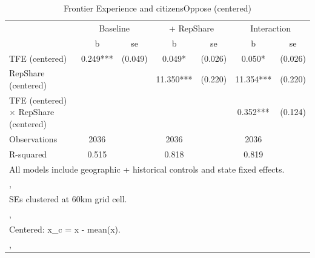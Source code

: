 \begin{table}[htbp]\centering
\def\sym#1{\ifmmode^{#1}\else\(^{#1}\)\fi}
\caption{Frontier Experience and citizensOppose (centered)}
\begin{tabular}{l*{3}{cc}}
\toprule
                &\multicolumn{2}{c}{Baseline}&\multicolumn{2}{c}{ + RepShare}&\multicolumn{2}{c}{Interaction}\\
                &        b   &       se&        b   &       se&        b   &       se\\
\midrule
TFE (centered)  &    0.249***&  (0.049)&    0.049*  &  (0.026)&    0.050*  &  (0.026)\\
RepShare (centered)&            &         &   11.350***&  (0.220)&   11.354***&  (0.220)\\
TFE (centered) $\times$ RepShare (centered)&            &         &            &         &    0.352***&  (0.124)\\
\midrule
Observations    &     2036   &         &     2036   &         &     2036   &         \\
R-squared       &    0.515   &         &    0.818   &         &    0.819   &         \\
\bottomrule
\multicolumn{7}{l}{\footnotesize All models include geographic + historical controls and state fixed effects.}\\
\multicolumn{7}{l}{\footnotesize ,}\\
\multicolumn{7}{l}{\footnotesize SEs clustered at 60km grid cell.}\\
\multicolumn{7}{l}{\footnotesize ,}\\
\multicolumn{7}{l}{\footnotesize Centered: x\_c = x - mean(x).}\\
\multicolumn{7}{l}{\footnotesize ,}\\
\end{tabular}
\end{table}
